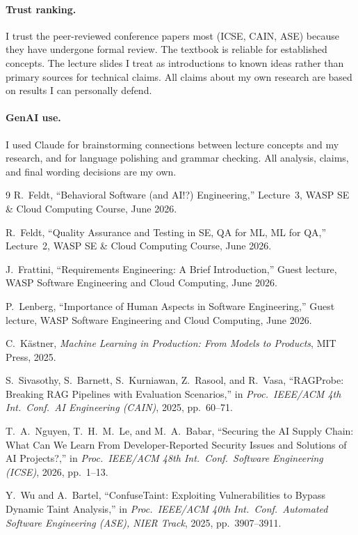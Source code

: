 \documentclass[a4paper,11pt]{article}
\theoremstyle{plain}
\begin{document}
\paragraph{Trust ranking.}
I trust the peer-reviewed conference papers most (ICSE, CAIN, ASE) because they have undergone formal review. The textbook is reliable for established concepts. The lecture slides I treat as introductions to known ideas rather than primary sources for technical claims. All claims about my own research are based on results I can personally defend.

\paragraph{GenAI use.}
I used Claude for brainstorming connections between lecture concepts and my research, and for language polishing and grammar checking. All analysis, claims, and final wording decisions are my own.


\begin{thebibliography}{9}
 R.~Feldt, ``Behavioral Software (and AI!?) Engineering,'' Lecture~3, WASP SE \& Cloud Computing Course, June 2026.

 R.~Feldt, ``Quality Assurance and Testing in SE, QA for ML, ML for QA,'' Lecture~2, WASP SE \& Cloud Computing Course, June 2026.

J.~Frattini, ``Requirements Engineering: A Brief Introduction,''
Guest lecture, WASP Software Engineering and Cloud Computing, June 2026.

P.~Lenberg, ``Importance of Human Aspects in Software Engineering,''
Guest lecture, WASP Software Engineering and Cloud Computing, June 2026.

C.~K{\"a}stner, \textit{Machine Learning in Production: From Models to Products},
MIT Press, 2025.

S.~Sivasothy, S.~Barnett, S.~Kurniawan, Z.~Rasool, and R.~Vasa,
``RAGProbe: Breaking RAG Pipelines with Evaluation Scenarios,''
in \textit{Proc.\ IEEE/ACM 4th Int.\ Conf.\ AI Engineering (CAIN)}, 2025, pp.~60--71.

T.~A.~Nguyen, T.~H.~M.~Le, and M.~A.~Babar,
``Securing the AI Supply Chain: What Can We Learn From Developer-Reported Security Issues and Solutions of AI Projects?,''
in \textit{Proc.\ IEEE/ACM 48th Int.\ Conf.\ Software Engineering (ICSE)}, 2026, pp.~1--13.

Y.~Wu and A.~Bartel,
``ConfuseTaint: Exploiting Vulnerabilities to Bypass Dynamic Taint Analysis,''
in \textit{Proc.\ IEEE/ACM 40th Int.\ Conf.\ Automated Software Engineering (ASE), NIER Track}, 2025, pp.~3907--3911.

\end{thebibliography}
\end{document}
